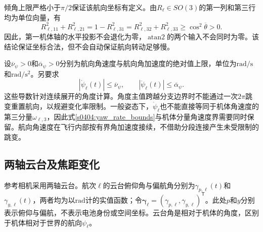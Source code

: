 倾角上限严格小于$\pi/2$保证该航向坐标有定义。由$R_\ell\in SO(3)$的第一列和第三行均为单位向量，有
\begin{equation}
 R_{\ell,11}^2+R_{\ell,21}^2
 =1-R_{\ell,31}^2
 =R_{\ell,32}^2+R_{\ell,33}^2
 \ge\cos^2\overline\theta>0.
 \label{s0404:yaw_regular}
\end{equation}
因此，第一机体轴的水平投影不会退化为零，$\operatorname{atan2}$的两个输入不会同时为零。该结论保证坐标合法，但不会自动保证航向转动足够慢。

设$\overline\nu_\psi>0$和$\overline\alpha_\psi>0$分别为航向角速度与航向角加速度的绝对值上限，单位为$\mathrm{rad/s}$和$\mathrm{rad/s^2}$。另要求
\begin{equation}
 |\dot\psi_\ell(t)|\le\overline\nu_\psi,
 \qquad
 |\ddot\psi_\ell(t)|\le\overline\alpha_\psi.
 \label{s0404:yaw_rate_bounds}
\end{equation}
这些导数针对连续展开的角度计算。角度主值跨越分支边界时不能通过一次$2\pi$跳变重置航向，以规避变化率限制。一般姿态下，$\dot\psi_\ell$也不能直接等同于机体角速度的第三分量$\omega_{\ell,3}$，因此式\eqref{s0404:yaw_rate_bounds}与机体分量角速度界需要同时保留。航向角速度在飞行内部按有界角加速度接续，不借助分段连接产生未受限制的跳变。

\subsection{两轴云台及焦距变化}

参考相机采用两轴云台。航次$\ell$的云台俯仰角与偏航角分别为$\gamma_{p,\ell}(t)$和$\gamma_{y,\ell}(t)$，两者均为以$\mathrm{rad}$计的实值函数；令$\boldsymbol\gamma_\ell=(\gamma_{p,\ell},\gamma_{y,\ell})^{\mathsf T}$。此处$p$和$y$分别表示俯仰与偏航，不表示电池身份或空间坐标。云台角是相对于机体的角度，区别于机体相对于世界的航向$\psi_\ell$。

